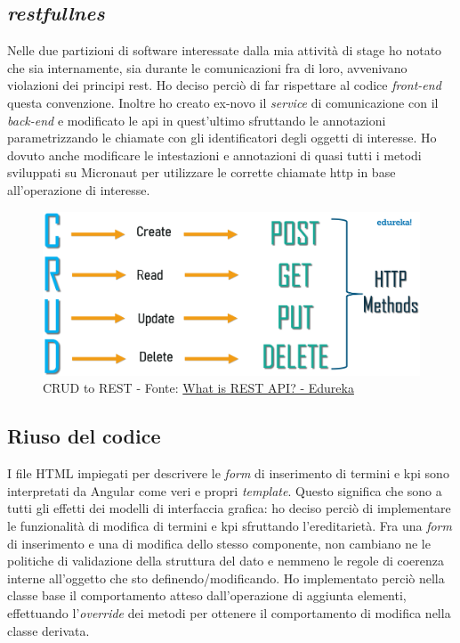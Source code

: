 \subsection{\textit{\acrshort{rest}fullnes}}
Nelle due partizioni di software interessate dalla mia attività di stage ho notato che sia internamente, sia durante le comunicazioni fra di loro, avvenivano violazioni dei principi \acrshort{rest}. Ho deciso perciò di far rispettare al codice \textit{front-end} questa convenzione. Inoltre ho creato ex-novo il \textit{service} di comunicazione con il \textit{back-end} e modificato le \acrshort{api} in quest'ultimo sfruttando le annotazioni parametrizzando le chiamate con gli identificatori degli oggetti di interesse. Ho dovuto anche modificare le intestazioni e annotazioni di quasi tutti i metodi sviluppati su Micronaut per utilizzare le corrette chiamate \acrshort{http} in base all'operazione di interesse.
\vspace{45pt}
\begin{figure}[H]
    \centering
    \includegraphics[width=0.90\columnwidth]{immagini/crudToRest.png}
    \caption{CRUD to REST - Fonte: \href{https://www.edureka.co/blog/what-is-rest-api/}{What is REST API? - Edureka}}
    \label{fig:crudToRest}
\end{figure}
\vspace{45pt}
\subsection{Riuso del codice}
I file HTML impiegati per descrivere le \textit{form} di inserimento di termini e \acrshort{kpi} sono interpretati da Angular come veri e propri \textit{template}. Questo significa che sono a tutti gli effetti dei modelli di interfaccia grafica: ho deciso perciò di implementare le funzionalità di modifica di termini e \acrshort{kpi} sfruttando l'ereditarietà. Fra una \textit{form} di inserimento e una di modifica dello stesso componente, non cambiano ne le politiche di validazione della struttura del dato e nemmeno le regole di coerenza interne all'oggetto che sto definendo/modificando. Ho implementato perciò nella classe base il comportamento atteso dall'operazione di aggiunta elementi, effettuando l'\textit{override} dei metodi per ottenere il comportamento di modifica nella classe derivata.
\newpage
